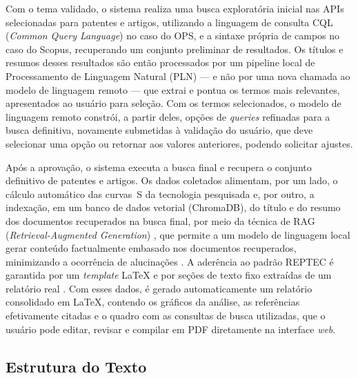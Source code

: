 \documentclass[12pt, a4paper]{article}
\begin{document}
  Com o tema validado, o sistema realiza uma busca exploratória inicial nas APIs selecionadas para patentes e artigos, utilizando a linguagem de consulta CQL
(\textit{Common Query Language}) no caso do OPS, e a sintaxe própria de campos no
caso do Scopus, recuperando um
conjunto preliminar de resultados. Os títulos e resumos desses resultados são então processados por um
pipeline local de Processamento de Linguagem Natural (PLN) --- e não por uma nova chamada ao modelo de
linguagem remoto --- que extrai e pontua os termos mais relevantes, apresentados ao
usuário para seleção. Com os termos selecionados, o modelo de linguagem remoto constrói,
a partir deles, opções de \textit{queries} refinadas para a
busca definitiva, novamente submetidas à validação do
usuário, que deve selecionar uma opção ou retornar aos valores anteriores, podendo solicitar ajustes.

  Após a aprovação, o sistema executa a busca final e recupera o conjunto
definitivo de patentes e artigos. Os dados coletados alimentam, por um lado, o
cálculo automático das curvas~S da tecnologia pesquisada e,
por outro, a indexação, em um
banco de dados vetorial (ChromaDB), do título e do resumo dos documentos
recuperados na busca final, por meio da técnica de RAG
(\textit{Retrieval-Augmented Generation}) \cite{lewis2020, gao2024}, que
permite a um modelo de linguagem local gerar conteúdo factualmente embasado
nos documentos recuperados, minimizando a ocorrência de alucinações
\cite{ji2022}. A aderência ao padrão REPTEC é garantida por um
\textit{template} LaTeX e por seções de texto fixo extraídas de um relatório
real \cite{reptec2023tetra}. Com esses dados, é gerado automaticamente um
relatório consolidado em LaTeX, contendo os gráficos da análise, as
referências efetivamente citadas e o quadro com as consultas de busca
utilizadas, que o usuário pode editar, revisar e compilar em PDF diretamente
na interface \textit{web}.

  \subsection{Estrutura do Texto}
\end{document}
